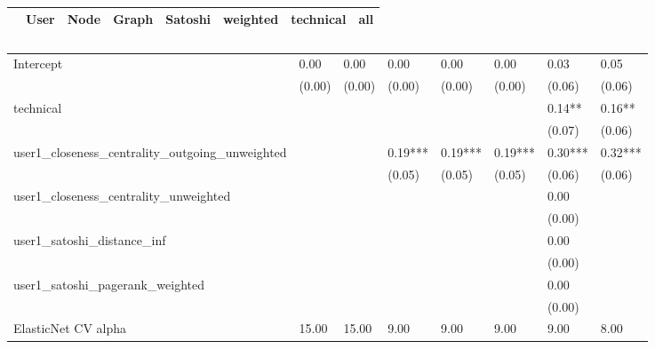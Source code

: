 \begin{table}
\caption{}
\begin{center}
\begin{tabular}{lccccccc}
\hline
                                               &   User  &   Node  &  Graph  & Satoshi & weighted & technical &   all    \\
\hline
\hline
\end{tabular}
\begin{tabular}{llllllll}
Intercept                                      & 0.00    & 0.00    & 0.00    & 0.00    & 0.00     & 0.03      & 0.05     \\
                                               & (0.00)  & (0.00)  & (0.00)  & (0.00)  & (0.00)   & (0.06)    & (0.06)   \\
technical                                      &         &         &         &         &          & 0.14**    & 0.16**   \\
                                               &         &         &         &         &          & (0.07)    & (0.06)   \\
user1_closeness_centrality_outgoing_unweighted &         &         & 0.19*** & 0.19*** & 0.19***  & 0.30***   & 0.32***  \\
                                               &         &         & (0.05)  & (0.05)  & (0.05)   & (0.06)    & (0.06)   \\
user1_closeness_centrality_unweighted          &         &         &         &         &          & 0.00      &          \\
                                               &         &         &         &         &          & (0.00)    &          \\
user1_satoshi_distance_inf                     &         &         &         &         &          & 0.00      &          \\
                                               &         &         &         &         &          & (0.00)    &          \\
user1_satoshi_pagerank_weighted                &         &         &         &         &          & 0.00      &          \\
                                               &         &         &         &         &          & (0.00)    &          \\
ElasticNet CV alpha                            & 15.00   & 15.00   & 9.00    & 9.00    & 9.00     & 9.00      & 8.00     \\

\end{tabular}
\end{center}
\end{table}
